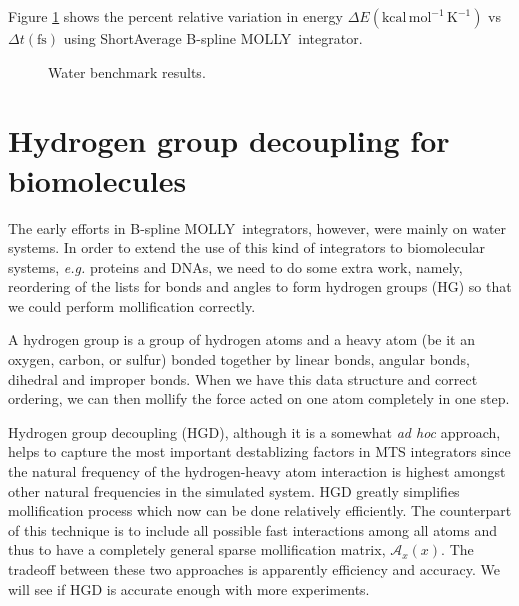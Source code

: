 \documentclass[11pt]{article}
\newcommand{\MOLLY}{\textsc{MOLLY\ }}
\begin{document}
Figure \ref{fig:water_benchmark} shows the percent relative variation
in energy $\Delta E (\mathrm{kcal}\, \mathrm{mol}^{-1}\,
\mathrm{K}^{-1})$ vs $\Delta t (\mathrm{fs})$ using ShortAverage
B-spline \MOLLY integrator. 

\begin{figure}[hbt]
\caption{Water benchmark results.}
\label{fig:water_benchmark}
\end{figure}

\section{Hydrogen group decoupling for biomolecules}
The early efforts in B-spline \MOLLY integrators, however,
were mainly on  water systems. In order 
to extend the use of this kind of integrators to biomolecular
systems, {\it e.g.} proteins and DNAs, we need to do some extra work,
namely, reordering of the lists for bonds and angles to form hydrogen
groups (HG) so that we could perform mollification correctly. 

A hydrogen group is a group of hydrogen atoms and a heavy atom (be it
an oxygen, carbon, or sulfur) bonded
together by linear bonds, angular bonds, dihedral and improper bonds. 
When we have this data structure and correct ordering, we can then
mollify the force acted on one atom completely in one step.

Hydrogen group decoupling (HGD), although it is a somewhat {\it ad hoc}
approach,  helps to capture the most important
destablizing factors in MTS integrators since the natural frequency of 
the hydrogen-heavy atom interaction is highest amongst other natural
frequencies in the simulated system. HGD greatly simplifies
mollification process which now can be done relatively efficiently. 
The counterpart of this technique is to include all possible fast
interactions among all atoms and thus to have a completely general
sparse mollification matrix, $\mathcal{A}_{x}(x).$ The tradeoff
between these two approaches is apparently efficiency and
accuracy. We will see if HGD is accurate enough with more experiments.
\end{document}
